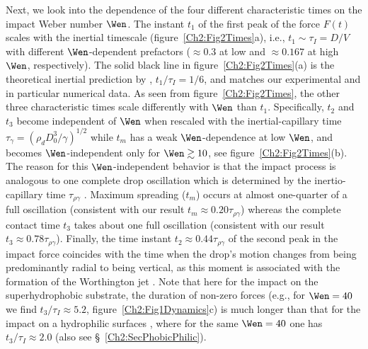 Next, we look into the dependence of the four different characteristic times on the impact Weber number $\Wen$. The instant $t_1$ of the first peak of the force $F(t)$ scales with the inertial timescale (figure~\ref{Ch2:Fig2Times}a), i.e., $t_1 \sim \tau_I =  D/V$ with different $\Wen$-dependent prefactors ($\approx 0.3$ at low and $\approx 0.167$ at high $\Wen$, respectively). The solid black line in figure~\ref{Ch2:Fig2Times}(a) is the theoretical inertial prediction by \citet{Gordillo2018}, $t_1/\tau_I = 1/6$, and matches our experimental and in particular numerical data. As seen from figure~\ref{Ch2:Fig2Times}, the other three characteristic times scale differently with $\Wen$ than $t_1$. Specifically, $t_2$ and $t_3$ become independent of $\Wen$ when rescaled with the inertial-capillary time $\tau_\gamma = \left(\rho_d D_0^3/\gamma\right)^{1/2}$ while $t_m$ has a weak $\Wen$-dependence at low $\Wen$, and becomes $\Wen$-independent only for $\Wen \gtrsim 10$, see figure~\ref{Ch2:Fig2Times}(b). The reason for this $\Wen$-independent behavior is that the impact process is analogous to one complete drop oscillation \cite{richard2002contact} which is determined by the inertio-capillary time $\tau_{\rho\gamma}$ \cite{rayleigh1879capillary}. Maximum spreading ($t_m$) occurs at almost one-quarter of a full oscillation (consistent with our result $t_m \approx 0.20 \tau_{\rho\gamma}$) whereas the complete contact time $t_3$ takes about one full oscillation (consistent with our result $t_3 \approx 0.78 \tau_{\rho\gamma}$). Finally, the time instant $t_2 \approx 0.44\tau_{\rho\gamma}$ of the second peak in the impact force coincides with the time when the drop's motion changes from being predominantly radial to being vertical, as this moment is associated with the formation of the Worthington jet \cite[p. 18-20]{chantelot2018rebonds}. Note that here for the impact on  the superhydrophobic substrate, the duration of non-zero  forces (e.g.,  for $\Wen = 40$ we find $t_3/\tau_I \approx 5.2$,  figure~\ref{Ch2:Fig1Dynamics}c) is much longer than that for the impact on a hydrophilic surfaces \citet{Gordillo2018, mitchell2019}, where for the same $\Wen = 40$ one has $t_3/\tau_I \approx 2.0$ (also see \S~\ref{Ch2:SecPhobicPhilic}).

